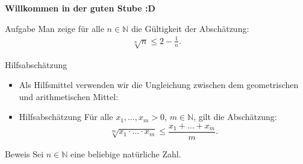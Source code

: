 \documentclass[10pt]{beamer}
\title{}
\author{Artur's Mathematikstübchen}
\date{}
\def\bN{\mathbb{N}}
\begin{document}

\begin{frame}
    \begin{center}
        \textbf{\huge Willkommen in der guten Stube \newline \newline :D}
    \end{center}
\end{frame}




\begin{frame}{}
    \begin{alertblock}{Aufgabe}
        Man zeige für alle \( n \in \bN \) die Gültigkeit der Abschätzung:
        \begin{align*}
            \sqrt[n]{n}
            \leq 2 - \frac{1}{n}.
        \end{align*}
    \end{alertblock}
\end{frame}



\begin{frame}{Hilfsabschätzung}
    \begin{itemize}
        \item<1->  Als Hilfsmittel verwenden wir die Ungleichung zwischen dem geometrischen und arithmetischen Mittel:   
        \item<2-> 
        \begin{block}{Hilfsabschätzung}
             Für alle \( x_{1}, \ldots, x_{m} > 0 \), \( m \in \bN \), gilt die Abschätzung:
             \[
                \sqrt[m]{x_{1} \cdot \ldots \cdot x_{m}} 
                \leq \frac{x_{1} + \ldots + x_{m}}{m}.
             \]
        \end{block} 
    \end{itemize}
\end{frame}



\begin{frame}{Beweis}
    Sei \( n \in \bN \) eine beliebige natürliche Zahl.
\end{frame}



\end{document}
